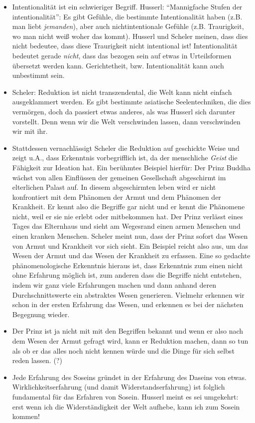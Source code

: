 \documentclass[a4paper, emulatestandardclasses]{scrartcl}
\begin{document}
\begin{itemize}
  \item Intentionalität ist ein schwieriger Begriff. Husserl: "`Mannigfache Stufen der intentionalität"': Es gibt Gefühle, die bestimmte Intentionalität haben (z.B. man liebt \emph{jemanden}), aber auch nichtintentionale Gefühle (z.B. Traurigkeit, wo man nicht weiß woher das kommt). Husserl und Scheler meinen, dass dies nicht bedeutee, dass diese Traurigkeit nicht intentional ist! Intentionalität bedeutet gerade \emph{nicht}, dass das bezogen sein auf etwas in Urteilsformen übersetzt werden kann. Gerichtetheit, bzw. Intentionalität kann auch unbestimmt sein.
  \item Scheler: Reduktion ist nicht transzendental, die Welt kann nicht einfach ausgeklammert werden. Es gibt bestimmte asiatische Seelentechniken, die dies vermörgen, doch da passiert etwas anderes, als was Husserl sich darunter vorstellt. Denn wenn wir die Welt verschwinden lassen, dann verschwinden wir mit ihr. 
  \item Stattdessen vernachlässigt Scheler die Reduktion auf geschickte Weise und zeigt u.A., dass Erkenntnis vorbegrifflich ist, da der menschliche \emph{Geist} die Fähigkeit zur Ideation hat. Ein berühmtes Beispiel hierfür: Der Prinz Buddha wächst von allen Einflüssen der gemeinen Gesellschaft abgeschirmt im elterlichen Palast auf. In diesem abgeschirmten leben wird er nicht konfrontiert mit dem Phänomen der Armut und dem Phänomen der Krankheit. Er kennt also die Begriffe gar nicht und er kennt die Phänomene nicht, weil er sie nie erlebt oder mitbekommen hat. Der Prinz verlässt eines Tages das Elternhaus und sieht am Wegesrand einen armen Menschen und einen kranken Menschen. Scheler meint nun, dass der Prinz sofort das Wesen von Armut und Krankheit vor sich sieht. Ein Beispiel reicht also aus, um das Wesen der Armut und das Wesen der Krankheit zu erfassen. Eine so gedachte phänomenologische Erkenntnis hieraus ist, dass Erkenntnis zum einen nicht ohne Erfahrung möglich ist, zum anderen dass die Begriffe nicht entstehen, indem wir ganz viele Erfahrungen machen und dann anhand deren Durchschnittswerte ein abstraktes Wesen generieren. Vielmehr erkennen wir schon in der ersten Erfahrung das Wesen, und erkennen es bei der nächsten Begegnung wieder. 
  \item Der Prinz ist ja nicht mit mit den Begriffen bekannt und wenn er also nach dem Wesen der Armut gefragt wird, kann er Reduktion machen, dann so tun als ob er das alles noch nicht kennen würde und die Dinge für sich selbst reden lassen. (?)
  \item Jede Erfahrung des Soseins gründet in der Erfahrung des Daseins von etwas. Wirklichkeitserfahrung (und damit Widerstandserfahrung) ist folglich fundamental für das Erfahren von Sosein. Husserl meint es sei umgekehrt: erst wenn ich die Widerständigkeit der Welt aufhebe, kann ich zum Sosein kommen!
\end{itemize}
\end{document}

